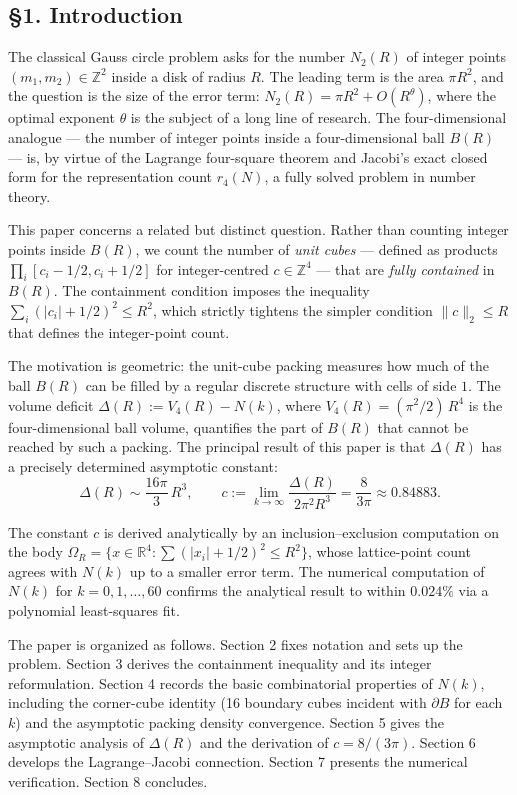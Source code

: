\documentclass[a4paper,11pt]{article}
\theoremstyle{definition}
\begin{document}
\subsection{§1. Introduction}\label{introduction}

The classical Gauss circle problem asks for the number \(N_2(R)\) of
integer points \((m_1, m_2) \in \mathbb{Z}^2\) inside a disk of radius
\(R\). The leading term is the area \(\pi R^2\), and the question is the
size of the error term: \(N_2(R) = \pi R^2 + O(R^\theta)\), where the
optimal exponent \(\theta\) is the subject of a long line of research.
The four-dimensional analogue --- the number of integer points inside a
four-dimensional ball \(B(R)\) --- is, by virtue of the Lagrange
four-square theorem and Jacobi's exact closed form for the
representation count \(r_4(N)\), a fully solved problem in number
theory.

This paper concerns a related but distinct question. Rather than
counting integer points inside \(B(R)\), we count the number of
\emph{unit cubes} --- defined as products
\(\prod_i [c_i - 1/2, c_i + 1/2]\) for integer-centred
\(c \in \mathbb{Z}^4\) --- that are \emph{fully contained} in \(B(R)\).
The containment condition imposes the inequality
\(\sum_i (|c_i| + 1/2)^2 \le R^2\), which strictly tightens the simpler
condition \(\|c\|_2 \le R\) that defines the integer-point count.

The motivation is geometric: the unit-cube packing measures how much of
the ball \(B(R)\) can be filled by a regular discrete structure with
cells of side \(1\). The volume deficit \(\Delta(R) := V_4(R) - N(k)\),
where \(V_4(R) = (\pi^2/2)\,R^4\) is the four-dimensional ball volume,
quantifies the part of \(B(R)\) that cannot be reached by such a
packing. The principal result of this paper is that \(\Delta(R)\) has a
precisely determined asymptotic constant:
\[\Delta(R) \sim \frac{16\pi}{3}\,R^3, \qquad c := \lim_{k\to\infty} \frac{\Delta(R)}{2\pi^2 R^3} = \frac{8}{3\pi} \approx 0.84883.\]

The constant \(c\) is derived analytically by an inclusion--exclusion
computation on the body
\(\Omega_R = \{x \in \mathbb{R}^4 : \sum (|x_i|+1/2)^2 \le R^2\}\),
whose lattice-point count agrees with \(N(k)\) up to a smaller error
term. The numerical computation of \(N(k)\) for \(k = 0, 1, \ldots, 60\)
confirms the analytical result to within \(0.024\%\) via a polynomial
least-squares fit.

The paper is organized as follows. Section 2 fixes notation and sets up
the problem. Section 3 derives the containment inequality and its
integer reformulation. Section 4 records the basic combinatorial
properties of \(N(k)\), including the corner-cube identity (16 boundary
cubes incident with \(\partial B\) for each \(k\)) and the asymptotic
packing density convergence. Section 5 gives the asymptotic analysis of
\(\Delta(R)\) and the derivation of \(c = 8/(3\pi)\). Section 6 develops
the Lagrange--Jacobi connection. Section 7 presents the numerical
verification. Section 8 concludes.
\end{document}

